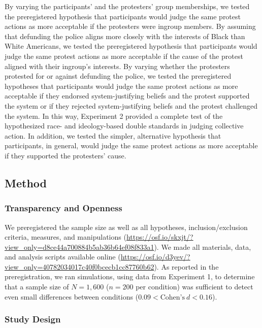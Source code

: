 \documentclass[12pt, letterpaper]{article}
\begin{document}
By varying the participants' and the protesters' group memberships, we
tested the preregistered hypothesis that participants would judge the
same protest actions as more acceptable if the protesters were ingroup
members. By assuming that defunding the police aligns more closely with
the interests of Black than White Americans, we tested the preregistered
hypothesis that participants would judge the same protest actions as
more acceptable if the cause of the protest aligned with their ingroup's
interests. By varying whether the protesters protested for or against
defunding the police, we tested the preregistered hypotheses that
participants would judge the same protest actions as more acceptable if
they endorsed system-justifying beliefs and the protest supported the
system or if they rejected system-justifying beliefs and the protest
challenged the system. In this way, Experiment 2 provided a complete
test of the hypothesized race- and ideology-based double standards in
judging collective action. In addition, we tested the simpler,
alternative hypothesis that participants, in general, would judge the
same protest actions as more acceptable if they supported the
protesters' cause.

\hypertarget{method-1}{%
\subsection{Method}\label{method-1}}

\hypertarget{transparency-and-openness-1}{%
\subsubsection{Transparency and
Openness}\label{transparency-and-openness-1}}

We preregistered the sample size as well as all hypotheses,
inclusion/exclusion criteria, measures, and manipulations
(\url{https://osf.io/skxjt/?view_only=d8ce44a700884b5ab36b64ef08f833a1}).
We made all materials, data, and analysis scripts available online
(\url{https://osf.io/d3yev/?view_only=40782034017c40f0bcecb1cc87760b62}).
As reported in the preregistration, we ran simulations, using data from
Experiment 1, to determine that a sample size of \(N = 1,600\)
(\(n = 200\) per condition) was sufficient to detect even small
differences between conditions (\(0.09 < \text{Cohen's}~d < 0.16\)).

\hypertarget{study-design-1}{%
\subsubsection{Study Design}\label{study-design-1}}
\end{document}
